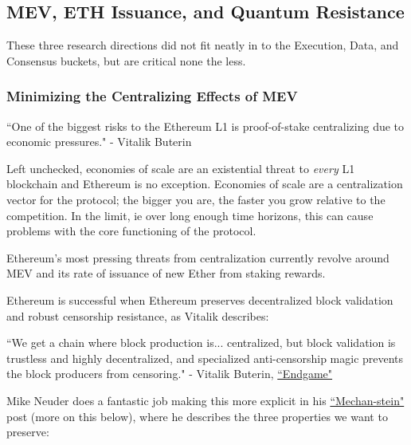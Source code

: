 \documentclass[12pt]{article}
\begin{document}
\subsection{\textbf{MEV, ETH Issuance, and Quantum Resistance}}

These three research directions did not fit neatly in to the Execution, Data, and Consensus buckets, but are critical none the less. 

\subsubsection{Minimizing the Centralizing Effects of MEV}

\begin{center}
    ``One of the biggest risks to the Ethereum L1 is proof-of-stake centralizing due to economic pressures." - Vitalik Buterin
\end{center}

Left unchecked, economies of scale are an existential threat to \textit{every} L1 blockchain and Ethereum is no exception. Economies of scale are a centralization vector for the protocol; the bigger you are, the faster you grow relative to the competition. In the limit, ie over long enough time horizons, this can cause problems with the core functioning of the protocol. 

Ethereum's most pressing threats from centralization currently revolve around MEV and its rate of issuance of new Ether from staking rewards. 

Ethereum is successful when Ethereum preserves decentralized block validation and robust censorship resistance, as Vitalik describes:

\begin{center}
    ``We get a chain where block production is... centralized, but block validation is trustless and highly decentralized, and specialized anti-censorship magic prevents the block producers from censoring." - Vitalik Buterin, \href{https://vitalik.eth.limo/general/2021/12/06/endgame.html}{``Endgame"}
\end{center}

Mike Neuder does a fantastic job making this more explicit in his \href{https://ethresear.ch/t/mechan-stein-alt-franken-ism/20321}{``Mechan-stein"} post (more on this below), where he describes the three properties we want to preserve: 
\end{document}
